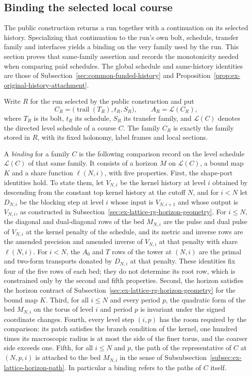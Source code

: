 \subsection{Binding the selected local course}
\label{sec:ex-lattice-selected-course-binding}

The public construction returns a run together with a continuation on its
selected history.  Specializing that continuation to the run's own bolt,
schedule, transfer family and interfaces yields a binding on the very family used
by the run.  This section proves that same-family assertion and records the
monotonicity needed when comparing paid schedules.  The global schedule and
same-history identities are those of Subsection~\ref{sec:common-funded-history}
and Proposition~\ref{prop:ex-original-history-attachment}.

Write $R$ for the run selected by the public construction and put
\[
 C_R=\bigl(\operatorname{trail}(T_R),t_R,S_R\bigr),
 \qquad A_R=\mathcal L(C_R),
\]
where $T_R$ is its bolt, $t_R$ its schedule, $S_R$ its transfer family, and
$\mathcal L(C)$ denotes the directed level schedule of a course $C$.  The
family $C_R$ is exactly the family stored in $R$, with its fixed holonomy,
label frames and local sections.

A \emph{binding} for a family $C$ is the following comparison record on
the level schedule $\mathcal L(C)$ of that same family. It consists of a
horizon $M$ on $\mathcal L(C)$, a bound map $K$ and a share function
$\ell(N,i)$, with five properties. First, the shape-port identities
hold. To state them, let $V_{N,i}$ be the kernel history at level $i$ obtained by
descending from the constant top kernel history at the cutoff $N$, and for $i<N$
let $D_{N,i}$ be the blocking step at level $i$ whose input is $V_{N,i+1}$ and
whose output is $V_{N,i}$, as constructed in
Subsection~\ref{sec:ex-lattice-rg-horizon-geometry}. For $i\le N$, the
diagonal and dual-diagonal rows of the bed $M_{N,i}$ are the pulse and
dual pulse of $V_{N,i}$ at the kernel penalty of the schedule, and its
metric and inverse rows are the amended precision and amended inverse of
$V_{N,i}$ at that penalty with share $\ell(N,i)$. For $i<N$, the $A_0$
and $T$ rows of the tower at $(N,i)$ are the primal and two-form
transports donated by $D_{N,i}$ at that penalty. These identities fix
four of the five rows of each bed; they do not determine its root row,
which is constrained only by the second and fifth properties. Second,
the horizon satisfies the horizon contract of
Subsection~\ref{sec:ex-lattice-rg-horizon-geometry} for the bound map $K$.
Third, for all $i\le N$ and every period $p$, the quadratic form of the
bed $M_{N,i}$ on the torus of level $i$ and period $p$ is invariant under
the signed coordinate changes. Fourth, every level step $(i,p)$ has the
room required by the comparison: its patch satisfies the branch condition
of the kernel, one hundred times its macroscopic radius is at most the
side of the finer torus, and the coarser side exceeds one. Fifth, for
all $i\le N$ and $p$, the path of the representative of $C$ at $(N,p,i)$
is attached to the bed $M_{N,i}$ in the sense of
Subsubsection~\ref{subsec:ex-lattice-horizon-path}. In particular a binding
refers to the paths of $C$ itself.

